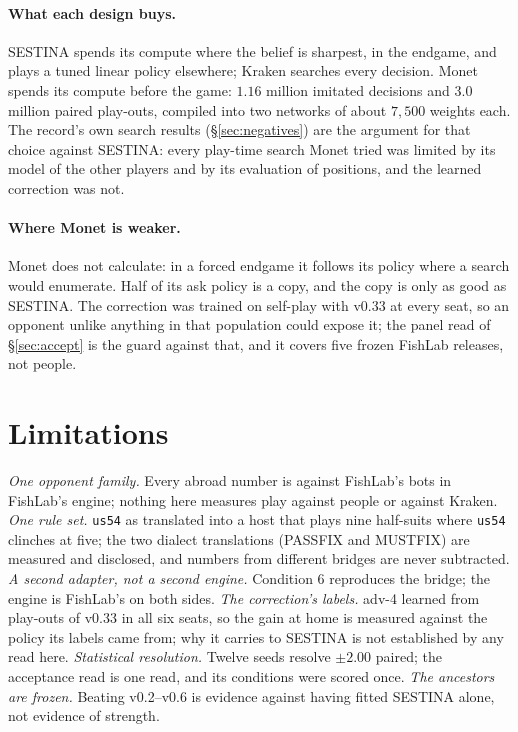 \documentclass[11pt]{article}
\newcommand{\code}[1]{\texttt{#1}}
\newcommand{\usff}{\code{us54}}
\newcommand{\sect}[1]{\S#1}
\begin{document}
\paragraph{What each design buys.} SESTINA spends its compute where the belief is sharpest, in the
endgame, and plays a tuned linear policy elsewhere; Kraken searches every decision. Monet spends its
compute before the game: $1.16$ million imitated decisions and $3.0$ million paired play-outs,
compiled into two networks of about $7{,}500$ weights each. The record's own search results
(\sect\ref{sec:negatives}) are the argument for that choice against SESTINA: every play-time search
Monet tried was limited by its model of the other players and by its evaluation of positions, and the
learned correction was not.

\paragraph{Where Monet is weaker.} Monet does not calculate: in a forced endgame it follows its policy
where a search would enumerate. Half of its ask policy is a copy, and the copy is only as good as
SESTINA. The correction was trained on self-play with v0.33 at every seat, so an opponent unlike
anything in that population could expose it; the panel read of \sect\ref{sec:accept} is the guard
against that, and it covers five frozen FishLab releases, not people.

\section{Limitations}
\label{sec:limits}

\emph{One opponent family.} Every abroad number is against FishLab's bots in FishLab's engine; nothing
here measures play against people or against Kraken. \emph{One rule set.} \usff{} as translated into a
host that plays nine half-suits where \usff{} clinches at five; the two dialect translations (PASSFIX
and MUSTFIX) are measured and disclosed, and numbers from different bridges are never subtracted.
\emph{A second adapter, not a second engine.} Condition 6 reproduces the bridge; the engine is
FishLab's on both sides. \emph{The correction's labels.} adv-4 learned from play-outs of v0.33 in all
six seats, so the gain at home is measured against the policy its labels came from; why it carries to
SESTINA is not established by any read here. \emph{Statistical resolution.} Twelve seeds resolve
$\pm 2.00$ paired; the acceptance read is one read, and its conditions were scored once.
\emph{The ancestors are frozen.} Beating v0.2--v0.6 is evidence against having fitted SESTINA alone,
not evidence of strength.
\end{document}
